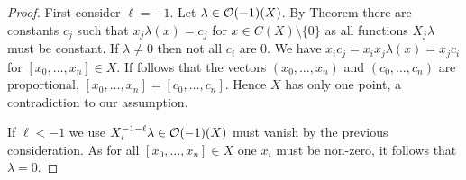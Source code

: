\documentclass[a4paper,parskip=half,numbers=enddot, DIV=12]{scrreprt}
\begin{document}
\begin{proof}
    First consider $\ell=-1$. Let $\lambda\in \mathcal{O}(-1)(X)$. By Theorem  there are constants $c_j$ such that $x_j \lambda(x) = c_j$ for $x\in C(X)\setminus\{0\}$ as all functions $X_j\lambda$ must be constant. If $\lambda\neq 0$ then not all $c_i$ are $0$. We have $x_ic_j = x_ix_j\lambda(x) = x_jc_i$ for $[x_0,\ldots, x_n]\in X$. If follows that the vectors $(x_0,\ldots, x_n)$ and $(c_0,\ldots, c_n)$ are proportional, $[x_0,\ldots, x_n] = [c_0,\ldots, c_n]$. Hence $X$ has only one point, a contradiction to our assumption. 
    
    If $\ell<-1$ we use $X_i^{-1-\ell}\lambda\in \mathcal{O}(-1)(X)$ must vanish by the previous consideration. As for all $[x_0,\ldots,x_n]\in X$ one $x_i$ must be non-zero, it follows that $\lambda = 0$.
\end{proof}
\end{document}
